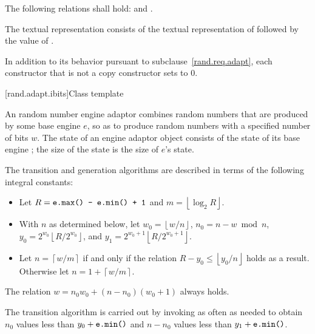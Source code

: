 \pnum
The following relations shall hold:
and
  .

\pnum
The textual representation
consists of
 the textual representation of 
followed by
 the value of .

\pnum
In addition to its behavior
pursuant to subclause~\ref{rand.req.adapt},
each constructor%
that is not a copy constructor
sets  to $0$.


[rand.adapt.ibits]{Class template }%
%

\pnum
An 
random number engine adaptor
combines random numbers
that are produced by some base engine $e$,
so as to produce random numbers
with a specified number of bits $w$.
The state 
of an 
engine adaptor object 
consists of
 the state  of its base engine ;
the size of the state is
 the size of $e$'s state.

\pnum
The transition and generation algorithms
are described in terms
of the following integral constants:%
\begin{itemize}
 \item
   Let
     $R = \texttt{\protect e.max() - e.min() + 1}$
   and
     $m = \left\lfloor \log_2 R \right\rfloor$.
 \item
   With $n$ as determined below,
   let
     $w_0 = \left\lfloor w / n \right\rfloor$,
     $n_0 = n - w \bmod n$,
     $y_0 = 2^{w_0} \left\lfloor R / 2^{w_0} \right\rfloor$,
   and
     $y_1 = 2^{w_0 + 1} \left\lfloor R / 2^{w_0 + 1} \right\rfloor$.
 \item
   Let
     $n = \left\lceil w / m \right\rceil$
   if and only if the relation
     $R - y_0 \leq \left\lfloor y_0 / n \right\rfloor$
   holds as a result.
   Otherwise let
     $n = 1 + \left\lceil w / m \right\rceil$.
\end{itemize}
\begin{note}
 The relation
 $w = n_0 w_0 + (n - n_0)(w_0 + 1)$
 always holds.
\end{note}

\pnum
The transition algorithm
is carried out by invoking 
as often as needed to obtain $n_0$
values less than $y_0 + \texttt{\protect e.min()}$
and $n - n_0$ values less than $y_1 + \texttt{\protect e.min()}$.

